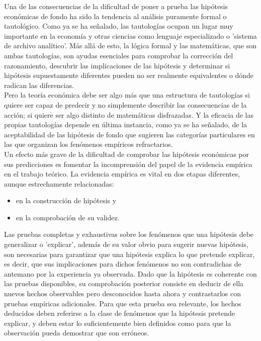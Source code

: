 Una de las consecuencias de la dificultad de poner a prueba las hipótesis económicas de fondo ha sido la tendencia al análisis puramente formal o tautológico. Como ya se ha señalado, las tautologías ocupan un lugar muy importante en la economía y otras ciencias como lenguaje especializado o 'sistema de archivo analítico'. Más allá de esto, la lógica formal y las matemáticas, que son ambas tautologías, son ayudas esenciales para comprobar la corrección del razonamiento, descubrir las implicaciones de las hipótesis y determinar si hipótesis supuestamente diferentes pueden no ser realmente equivalentes o dónde radican las diferencias.\\
Pero la teoría económica debe ser algo más que una estructura de tautologías si quiere ser capaz de predecir y no simplemente describir las consecuencias de la acción; si quiere ser algo distinto de matemáticas disfrazadas. Y la eficacia de las propias tautologías depende en última instancia, como ya se ha señalado, de la aceptabilidad de las hipótesis de fondo que sugieren las categorías particulares en las que organizan los fenómenos empíricos refractarios.\\

Un efecto más grave de la dificultad de comprobar las hipótesis económicas por sus predicciones es fomentar la incomprensión del papel de la evidencia empírica en el trabajo teórico. La evidencia empírica es vital en dos etapas diferentes, aunque estrechamente relacionadas: 
\begin{itemize}
    \item en la construcción de hipótesis y 
    \item en la comprobación de su validez.
\end{itemize}

Las pruebas completas y exhaustivas sobre los fenómenos que una hipótesis debe generalizar o 'explicar', además de su valor obvio para sugerir nuevas hipótesis, son necesarias para garantizar que una hipótesis explica lo que pretende explicar, es decir, que sus implicaciones para dichos fenómenos no son contradichas de antemano por la experiencia ya observada. Dado que la hipótesis es coherente con las pruebas disponibles, su comprobación posterior consiste en deducir de ella nuevos hechos observables pero desconocidos hasta ahora y contrastarlos con pruebas empíricas adicionales. Para que esta prueba sea relevante, los hechos deducidos deben referirse a la clase de fenómenos que la hipótesis pretende explicar, y deben estar lo suficientemente bien definidos como para que la observación pueda demostrar que son erróneos.\\

